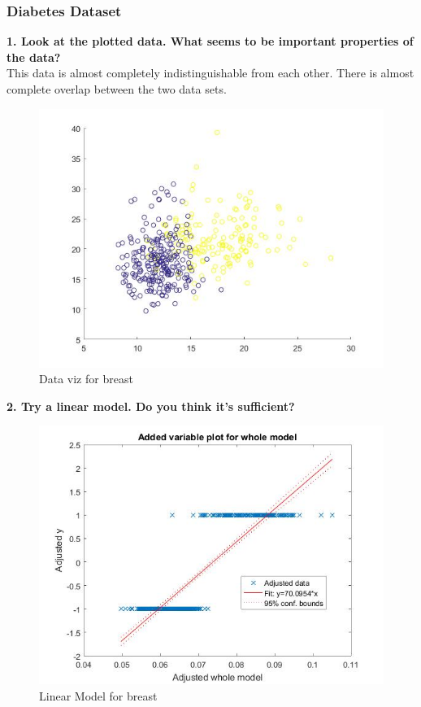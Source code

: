 \documentclass[11pt,oneside,a4paper]{article}
\begin{document}
\subsubsection{Diabetes Dataset}

\textbf{1. Look at the plotted data. What seems to be important properties of the data?}\\

This data is almost completely indistinguishable from each other. There is almost complete overlap between the two data sets. 
\begin{figure}[H]
	\centering
	\includegraphics[scale=0.4]{../Figures/breast_viz}
	\caption{Data viz for breast }
\end{figure}

\textbf{2. Try a linear model. Do you think it’s sufficient?}\\

\begin{figure}[H]
	\centering
	\includegraphics[scale=0.4]{../Figures/breast_lin}
	\caption{Linear Model for  breast }
\end{figure}
\end{document}
